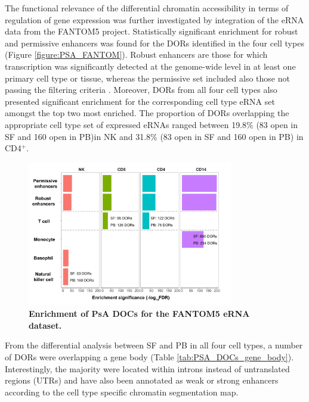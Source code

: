 The functional relevance of the differential chromatin accessibility in terms of regulation of gene expression was further investigated by integration of the eRNA data from the FANTOM5 project. Statistically significant enrichment for robust and permissive enhancers was found for the DORs identified in the four cell types (Figure \ref{figure:PSA_FANTOM}). Robust enhancers are those for which transcription was significantly detected at the genome-wide level in at least one primary cell type or tissue, whereas the permissive set included also those not passing the filtering criteria \parencite{Andersson2014}. Moreover, DORs from all four cell types also presented significant enrichment for the corresponding cell type eRNA set amongst the top two most enriched. The proportion of DORs overlapping the appropriate cell type set of expressed eRNAs ranged between 19.8\% (83 open in SF and 160 open in PB)in NK and 31.8\% (83 open in SF and 160 open in PB) in CD4$^+$.


\begin{figure}[htbp]
\centering
\includegraphics[width=0.8\textwidth]{./Results3/pdfs/ATAC_PsA_FANTOM_enhancer_enrichment_all_cell_types}
\caption[Enrichment of PsA DOCs for the FANTOM5 eRNA dataset]{\textbf{Enrichment of PsA DOCs for the FANTOM5 eRNA dataset.}  }
\label{fig:PSA_FANTOM}
\end{figure}

From the differential analysis between SF and PB in all four cell types, a number of DORs were overlapping a gene body (Table \ref{tab:PSA_DOCs_gene_body}). Interestingly, the majority were located within introns instead of untranslated regions (UTRs) and have also been annotated as weak or strong enhancers according to the cell type specific chromatin segmentation map. 


